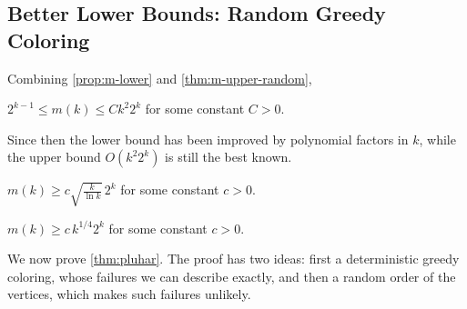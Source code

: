 \subsection{Better Lower Bounds: Random Greedy Coloring}

Combining \autoref{prop:m-lower} and \autoref{thm:m-upper-random},
\begin{theorem}[Erd\H{o}s, 1963--64]
    \(2^{k-1} \le m(k) \le C k^2 2^k\) for some constant \(C > 0\).
\end{theorem}
Since then the lower bound has been improved by polynomial factors in \(k\), while the upper bound \(O(k^2 2^k)\) is still the best known.
\begin{theorem}
    \(m(k) \ge c \sqrt{\frac{k}{\ln k}} \, 2^k\) for some constant \(c > 0\).
\end{theorem}
\begin{theorem}[Pluh\'ar, 2009]\label{thm:pluhar}
    \(m(k) \ge c \, k^{1/4} 2^k\) for some constant \(c > 0\).
\end{theorem}

We now prove \autoref{thm:pluhar}. The proof has two ideas: first a deterministic greedy coloring, whose failures we can describe exactly, and then a random order of the vertices, which makes such failures unlikely.

